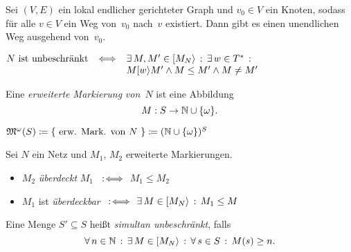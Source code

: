 \documentclass{cheat-sheet}
\newcommand{\activeTransition}[1]{[{#1}\rangle} %
\newcommand{\ExtMarkings}{\mathfrak{M}^\omega} %
\begin{document}
\begin{lem}
  Sei $(V, E)$ ein lokal endlicher gerichteter Graph und $v_0 \in V$ ein Knoten, sodass für alle $v \in V$ ein Weg von~$v_0$ nach~$v$ existiert. 
  Dann gibt es einen unendlichen Weg ausgehend von~$v_0$.
\end{lem}

\begin{satz}
  $
    N \text{ ist unbeschränkt} \enspace \iff
    \begin{array}[t]{l}
      \ex{M, M' \in \activeTransition{M_N}} \ex{w \in T^*} \\
      M \activeTransition{w} M' \wedge M \leq M' \wedge M \neq M'
    \end{array}
  $
\end{satz}

\begin{defn}
  Eine \emph{erweiterte Markierung} \textit{von~$N$} ist eine Abbildung
  \[
    M : S \to \mathbb{N} \cup \{ \omega \}.
  \]
\end{defn}

\begin{nota}
  $\ExtMarkings(S) \coloneqq \{ \text{ erw. Mark. von~$N$ } \} \coloneqq (\N \cup \{ \omega \})^S$
\end{nota}

\begin{defn}
  Sei $N$ ein Netz und $M_1$, $M_2$ erweiterte Markierungen.
  \begin{itemize}
    \item $M_2$ \emph{überdeckt} $M_1$ $\enspace:\!\iff$ $M_1 \leq M_2$
    \item $M_1$ ist \emph{überdeckbar} $\enspace:\!\iff$ $\ex{M \in \activeTransition{M_N}} M_1 \leq M$
  \end{itemize}
\end{defn}

\begin{defn}
  Eine Menge $S' \subseteq S$ heißt \emph{simultan unbeschränkt}, falls
  \[
    \fa{n \in \N} \ex{M \in \activeTransition{M_N}} \fa{s \in S} M(s) \geq n.
  \]
\end{defn}
\end{document}
